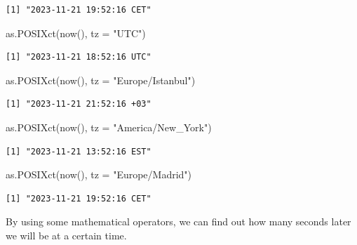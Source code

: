 \documentclass[
  letterpaper,
  DIV=11,
  numbers=noendperiod]{scrartcl}
\newenvironment{Shaded}{\begin{snugshade}}{\end{snugshade}}
\newcommand{\AttributeTok}[1]{\textcolor[rgb]{0.40,0.45,0.13}{#1}}
\newcommand{\FunctionTok}[1]{\textcolor[rgb]{0.28,0.35,0.67}{#1}}
\newcommand{\NormalTok}[1]{\textcolor[rgb]{0.00,0.23,0.31}{#1}}
\newcommand{\StringTok}[1]{\textcolor[rgb]{0.13,0.47,0.30}{#1}}
\begin{document}
\begin{verbatim}
[1] "2023-11-21 19:52:16 CET"
\end{verbatim}

\begin{Shaded}
\begin{Highlighting}[]
\FunctionTok{as.POSIXct}\NormalTok{(}\FunctionTok{now}\NormalTok{(), }\AttributeTok{tz =} \StringTok{"UTC"}\NormalTok{) }
\end{Highlighting}
\end{Shaded}

\begin{verbatim}
[1] "2023-11-21 18:52:16 UTC"
\end{verbatim}

\begin{Shaded}
\begin{Highlighting}[]
\FunctionTok{as.POSIXct}\NormalTok{(}\FunctionTok{now}\NormalTok{(), }\AttributeTok{tz =} \StringTok{"Europe/Istanbul"}\NormalTok{) }
\end{Highlighting}
\end{Shaded}

\begin{verbatim}
[1] "2023-11-21 21:52:16 +03"
\end{verbatim}

\begin{Shaded}
\begin{Highlighting}[]
\FunctionTok{as.POSIXct}\NormalTok{(}\FunctionTok{now}\NormalTok{(), }\AttributeTok{tz =} \StringTok{"America/New\_York"}\NormalTok{) }
\end{Highlighting}
\end{Shaded}

\begin{verbatim}
[1] "2023-11-21 13:52:16 EST"
\end{verbatim}

\begin{Shaded}
\begin{Highlighting}[]
\FunctionTok{as.POSIXct}\NormalTok{(}\FunctionTok{now}\NormalTok{(), }\AttributeTok{tz =} \StringTok{"Europe/Madrid"}\NormalTok{)}
\end{Highlighting}
\end{Shaded}

\begin{verbatim}
[1] "2023-11-21 19:52:16 CET"
\end{verbatim}

By using some mathematical operators, we can find out how many seconds
later we will be at a certain time.
\end{document}
